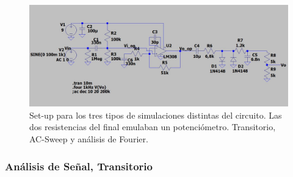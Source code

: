 \begin{figure}[H]
	\centering
	\includegraphics[width=1\textwidth, trim={0 0 0 0}, clip]{Ejercicio5/Imagenes/Circuito_base/Sim/sim_base.JPG}
	\caption{Set-up para los tres tipos de simulaciones distintas del circuito. Las dos resistencias del final emulaban un potenciómetro. Transitorio, AC-Sweep y análisis de Fourier.}
	\label{fig:sim_base}
\end{figure}

\subsubsection{Análisis de Señal, Transitorio}

